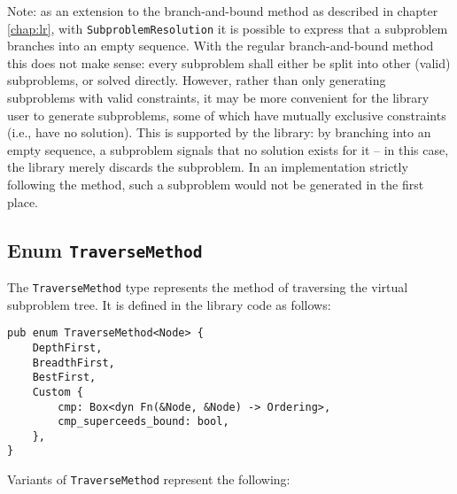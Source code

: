 Note: as an extension to the branch-and-bound method as described in chapter \ref{chap:lr},
with \texttt{SubproblemResolution} it is possible to express that a subproblem branches
into an empty sequence. With the regular branch-and-bound method this does not make sense:
every subproblem shall either be split into other (valid) subproblems, or solved directly.
However, rather than only generating subproblems with valid constraints, it may be more
convenient for the library user to generate subproblems, some of which have mutually exclusive
constraints (i.e., have no solution). This is supported by the library:
by branching into an empty sequence, a subproblem signals that no solution exists for it --
in this case, the library merely discards the subproblem. In an implementation strictly
following the method, such a subproblem would not be generated in the first place.

\subsection{Enum \texttt{TraverseMethod}}

The \texttt{TraverseMethod} type represents the method of traversing the virtual subproblem
tree. It is defined in the library code as follows:

\begin{lstlisting}[caption=Enum \texttt{TraverseMethod}]
pub enum TraverseMethod<Node> {
    DepthFirst,
    BreadthFirst,
    BestFirst,
    Custom {
        cmp: Box<dyn Fn(&Node, &Node) -> Ordering>,
        cmp_superceeds_bound: bool,
    },
}
\end{lstlisting}

Variants of \texttt{TraverseMethod} represent the following:

